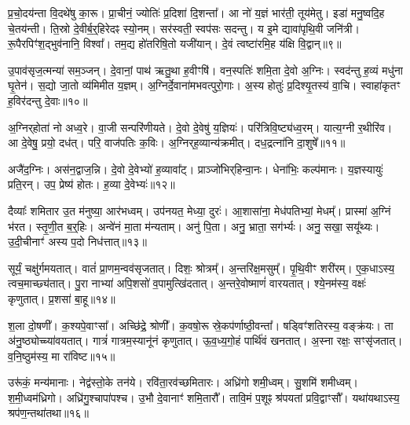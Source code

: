 प्र॒चो॒दय॑न्ता वि॒दथे॑षु का॒रू।
प्रा॒चीनं॒ ज्योतिः॑ प्र॒दिशा॑ दि॒शन्ता᳚।
आ नो॑ य॒ज्ञं भार॑ती॒ तूय॑मेतु।
इडा॑ मनु॒ष्वदि॒ह चे॒तय॑न्ती।
ति॒स्रो दे॒वीर्ब॒र्‌॒\mbox{}हिरेदꣴ स्यो॒नम्।
सर॑स्वती॒ स्वप॑सः सदन्तु।
य इ॒मे द्यावा॑पृथि॒वी जनि॑त्री।
रू॒पैरपिꣳ॑श॒द्भुव॑नानि॒ विश्वा᳚।
तम॒द्य हो॑तरिषि॒तो यजी॑यान्।
दे॒वं त्वष्टा॑रमि॒ह य॑क्षि वि॒द्वान्॥९॥

उ॒पाव॑सृज॒त्मन्या॑ सम॒ञ्जन्।
दे॒वानां॒ पाथ॑ ऋतु॒था ह॒वीꣳषि॑।
वन॒स्पतिः॑ शमि॒ता दे॒वो अ॒ग्निः।
स्वद॑न्तु ह॒व्यं मधु॑ना घृ॒तेन॑।
स॒द्यो जा॒तो व्य॑मिमीत य॒ज्ञम्।
अ॒ग्निर्दे॒वाना॑मभवत्पुरो॒गाः।
अ॒स्य होतुः॑ प्र॒दिश्यृ॒तस्य॑ वा॒चि।
स्वाहा॑कृतꣳ ह॒विर॑दन्तु दे॒वाः॥१०॥\anuvakamend[य॒ज्ञैः स्यो॒नं यज॑ध्यै वि॒द्वान॒ष्टौ च॑]

अ॒ग्निर्‌\mbox{}होता॑ नो अध्व॒रे।
वा॒जी सन्परि॑णीयते।
दे॒वो दे॒वेषु॑ य॒ज्ञियः॑।
परि॑त्रिवि॒ष्ट्य॑ध्व॒रम्।
यात्य॒ग्नी र॒थीरि॑व।
आ दे॒वेषु॒ प्रयो॒ दध॑त्।
परि॒ वाज॑पतिः क॒विः।
अ॒ग्निर्‌\mbox{}ह॒व्यान्य॑क्रमीत्।
दध॒द्रत्ना॑नि दा॒शुषे᳚॥११॥\anuvakamend[अ॒ग्निर्‌\mbox{}होता॑ नो॒ नव॑]

अजै॑द॒ग्निः।
अस॑न॒द्वाज॒न्नि।
दे॒वो दे॒वेभ्यो॑ ह॒व्यावा᳚ट्।
प्राञ्जो॑भिर्‌\mbox{}हिन्वा॒नः।
धेना॑भिः॒ कल्प॑मानः।
य॒ज्ञस्यायुः॑ प्रति॒रन्।
उप॒ प्रेष्य॑ होतः।
ह॒व्या दे॒वेभ्यः॑॥१२॥\anuvakamend[अजै॑द॒ष्टौ]

दैव्याः᳚ शमितार उ॒त म॑नुष्या॒ आर॑भध्वम्।
उप॑नयत॒ मेध्या॒ दुरः॑।
आ॒शासा॑ना॒ मेध॑पतिभ्यां॒ मेधम्᳚।
प्रास्मा॑ अ॒ग्निं भ॑रत।
स्तृ॒णी॒त ब॒र्॒हिः।
अन्वे॑नं मा॒ता म॑न्यताम्।
अनु॑ पि॒ता।
अनु॒ भ्राता॒ सग॑र्भ्यः।
अनु॒ सखा॒ सयू᳚थ्यः।
उ॒दी॒चीनाꣳ॑ अस्य प॒दो निध॑त्तात्॥१३॥

सूर्यं॒ चक्षु॑र्गमयतात्।
वातं॑ प्रा॒णम॒न्वव॑\-सृजतात्।
दिशः॒ श्रोत्रम्᳚।
अ॒न्तरि॑क्ष॒मसुम्᳚।
पृ॒थि॒वीꣳ शरी॑रम्।
ए॒क॒धा\-ऽस्य॒ त्वच॒माच्छ्य॑तात्।
पु॒रा नाभ्या॑ अपि॒शसो॑ व॒पामुत्खि॑दतात्।
अ॒न्तरे॒वोष्माणं॑ वारयतात्।
श्ये॒नम॑स्य॒ वक्षः॑ कृणुतात्।
प्र॒शसा॑ बा॒हू॥१४॥

श॒ला दो॒षणी᳚।
क॒श्यपे॒वाꣳसा᳚।
अच्छि॑द्रे॒ श्रोणी᳚।
क॒वषो॒रू स्रे॒कप॑र्णाष्ठी॒वन्ता᳚।
षड्विꣳ॑शतिरस्य॒ वङ्क्र॑यः।
ता अ॑नु॒ष्ठ्योच्च्या॑वयतात्।
गात्रं॑ गात्रम॒स्यानू॑नं कृणुतात्।
ऊ॒व॒ध्य॒गो॒हं पार्थि॑वं खनतात्।
अ॒स्ना रक्षः॒ सꣳसृ॑जतात्।
व॒नि॒ष्ठुम॑स्य॒ मा रा॑विष्ट॥१५॥

उरू॑कं॒ मन्य॑मानाः।
नेद्व॑स्तो॒के तन॑ये।
रवि॑ता॒रव॑च्छमितारः।
अध्रि॑गो शमी॒ध्वम्।
सु॒शमि॑ शमीध्वम्।
श॒मी॒ध्वम॑ध्रिगो।
अध्रि॑गु॒श्चापा॑पश्च।
उ॒भौ दे॒वानाꣳ॑ शमि॒तारौ᳚।
तावि॒मं प॒शूꣴ श्र॑पयतां प्रवि॒द्वाꣳसौ᳚।
यथा॑यथा\-ऽस्य॒ श्रप॑ण॒न्तथा॑तथा॥१६॥\anuvakamend[ध॒त्ता॒द्बा॒हू मा रा॑विष्ट॒ तथा॑तथा]

